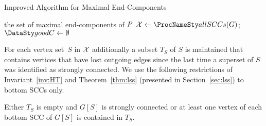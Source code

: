 \begin{algorithm2e}
	\caption{Improved Algorithm for Maximal End-Components}
	\label{alg:mecimpr}
	\BlankLine
	\Output
	{
	 the set of maximal end-components of $P$
	}
	\BlankLine
	$\mathcal{\ec} \gets \sccalg(G)$; $\goodC \gets \emptyset$\;
	\Return{$\goodC$}\;
\end{algorithm2e}

For each vertex set~$S$ in $\mathcal{X}$
additionally a subset $T_S$ of $S$ is maintained that contains vertices that
have lost outgoing edges since the last time a superset of $S$ was identified as 
strongly connected.
We use the following restrictions of Invariant~\ref{inv:HT} and Theorem~\ref{thm:lss}
(presented in Section~\ref{sec:lss}) to bottom SCCs only.

\begin{invariant}\label{inv:T}
	Either  $T_S$ is empty and 
	$G[S]$ is strongly connected or  at least one vertex of
	each bottom SCC of $G[S]$ is contained in $T_S$.
\end{invariant}

